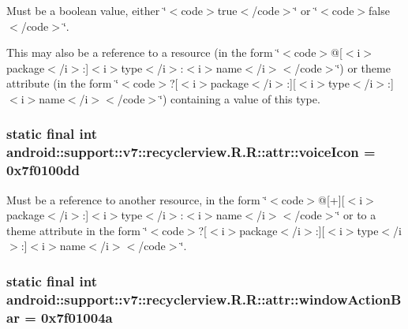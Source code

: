 Must be a boolean value, either \char`\"{}$<$code$>$true$<$/code$>$\char`\"{} or \char`\"{}$<$code$>$false$<$/code$>$\char`\"{}. 

This may also be a reference to a resource (in the form \char`\"{}$<$code$>$@\mbox{[}$<$i$>$package$<$/i$>$:\mbox{]}$<$i$>$type$<$/i$>$:$<$i$>$name$<$/i$>$$<$/code$>$\char`\"{}) or theme attribute (in the form \char`\"{}$<$code$>$?\mbox{[}$<$i$>$package$<$/i$>$:\mbox{]}\mbox{[}$<$i$>$type$<$/i$>$:\mbox{]}$<$i$>$name$<$/i$>$$<$/code$>$\char`\"{}) containing a value of this type. \hypertarget{classandroid_1_1support_1_1v7_1_1recyclerview_1_1_r_1_1attr_b353e023ff448db4d45d0ee54dcc7ea4}{
\subsubsection[{voiceIcon}]{\setlength{\rightskip}{0pt plus 5cm}static final int android::support::v7::recyclerview.R.R::attr::voiceIcon = 0x7f0100dd}}
\label{classandroid_1_1support_1_1v7_1_1recyclerview_1_1_r_1_1attr_b353e023ff448db4d45d0ee54dcc7ea4}


Must be a reference to another resource, in the form \char`\"{}$<$code$>$@\mbox{[}+\mbox{]}\mbox{[}$<$i$>$package$<$/i$>$:\mbox{]}$<$i$>$type$<$/i$>$:$<$i$>$name$<$/i$>$$<$/code$>$\char`\"{} or to a theme attribute in the form \char`\"{}$<$code$>$?\mbox{[}$<$i$>$package$<$/i$>$:\mbox{]}\mbox{[}$<$i$>$type$<$/i$>$:\mbox{]}$<$i$>$name$<$/i$>$$<$/code$>$\char`\"{}. \hypertarget{classandroid_1_1support_1_1v7_1_1recyclerview_1_1_r_1_1attr_8bcc2f030b343fa1557913aa87c56772}{
\subsubsection[{windowActionBar}]{\setlength{\rightskip}{0pt plus 5cm}static final int android::support::v7::recyclerview.R.R::attr::windowActionBar = 0x7f01004a}}
\label{classandroid_1_1support_1_1v7_1_1recyclerview_1_1_r_1_1attr_8bcc2f030b343fa1557913aa87c56772}


